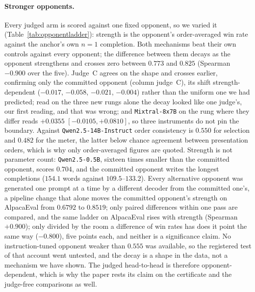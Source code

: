 \paragraph{Stronger opponents.}
Every judged arm is scored against one fixed opponent, so we varied it
(Table~\ref{tab:opponentladder}): strength is the opponent's order-averaged win rate against the anchor's
own $n=1$ completion. Both mechanisms beat their own controls against every opponent; the difference between
them decays as the opponent strengthens and crosses zero between $0.773$ and $0.825$ (Spearman $-0.900$ over
the five). Judge~C agrees on the shape and crosses earlier, confirming only the committed opponent (column judge~C), its shift strength-dependent ($-0.017$, $-0.058$, $-0.021$, $-0.004$) rather than the uniform one we had predicted; read on the three new rungs alone the decay looked like one judge's, our first reading, and that was wrong; and
\texttt{Mixtral-8x7B} on the rung where they differ reads $+0.0355$ $[-0.0105, +0.0810]$, so three
instruments do not pin the boundary. Against \texttt{Qwen2.5-14B-Instruct} order consistency is
$0.550$ for selection and $0.482$ for the meter, the latter below chance agreement between
presentation orders, which is why only order-averaged figures are quoted. Strength is not parameter count: \texttt{Qwen2.5-0.5B}, sixteen times
smaller than the committed opponent, scores $0.704$, and the committed opponent writes the longest
completions ($154.1$ words against $109.5$--$133.2$). Every alternative opponent was generated one prompt
at a time by a different decoder from the committed one's, a pipeline change that alone moves the committed
opponent's strength on AlpacaEval from $0.6792$ to $0.8519$; only paired differences within one pass are
compared, and the same ladder on AlpacaEval rises with strength (Spearman $+0.900$); only divided by the room a difference of win rates has does it point the same way ($-0.800$), five points each, and neither is a significance claim. No
instruction-tuned opponent weaker than $0.555$ was available, so the registered test of that account went untested, and the decay is a shape in the data, not a mechanism we have shown. The judged head-to-head is therefore opponent-dependent, which is why the paper rests its claim
on the certificate and the judge-free comparisons as well.

